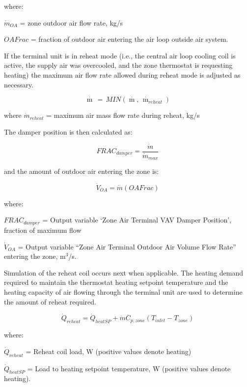 where:

\(\dot m_{OA}\) = zone outdoor air flow rate, kg/s

\(OAFrac\) = fraction of outdoor air entering the air loop outside air system.

If the terminal unit is in reheat mode (i.e., the central air loop cooling coil is active, the supply air was overcooled, and the zone thermostat is requesting heating) the maximum air flow rate allowed during reheat mode is adjusted as necessary.

\begin{equation}
\mathop m\limits^\cdot  \, = \,MIN\left( {\mathop m\limits^\cdot  ,\,{{\mathop m\limits^\cdot  }_{reheat}}} \right)
\end{equation}

where \(\dot m_{reheat}\) = maximum air mass flow rate during reheat, kg/s

The damper position is then calculated as:

\begin{equation}
FRAC_{damper} = \frac{\dot m}{\dot m_{max}}
\end{equation}

and the amount of outdoor air entering the zone is:

\begin{equation}
\dot V_{OA} = \dot m (OAFrac)
\end{equation}

where:

\(FRAC_{damper}\) = Output variable `Zone Air Terminal VAV Damper Position', fraction of maximum flow

\(\dot V_{OA}\) = Output variable ``Zone Air Terminal Outdoor Air Volume Flow Rate'' entering the zone, m\(^3\)/s.

Simulation of the reheat coil occurs next when applicable. The heating demand required to maintain the thermostat heating setpoint temperature and the heating capacity of air flowing through the terminal unit are used to determine the amount of reheat required.

\begin{equation}
{\dot Q_{reheat}} = {\dot Q_{heatSP}} + \dot m C_{p,zone}(T_{inlet}-T_{zone})
\end{equation}

where:

\({\dot Q_{reheat}}\) = Reheat coil load, W (positive values denote heating)

\({\dot Q_{heatSP}}\) = Load to heating setpoint temperature, W (positive values denote heating).

